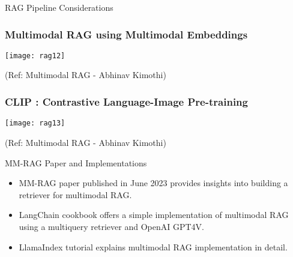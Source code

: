 \begin{frame}[fragile]{RAG Pipeline Considerations}
\begin{itemize}
\begin{itemize}
\begin{frame}[fragile]\frametitle{Multimodal RAG using Multimodal Embeddings}


		\begin{center}
		\texttt{[image: rag12]}
		\end{center}

{\tiny (Ref: Multimodal RAG - Abhinav  Kimothi)}

\end{frame}

\begin{frame}[fragile]\frametitle{CLIP : Contrastive Language-Image Pre-training}


		\begin{center}
		\texttt{[image: rag13]}
		\end{center}

{\tiny (Ref: Multimodal RAG - Abhinav  Kimothi)}

\end{frame}


\begin{frame}[fragile]{MM-RAG Paper and Implementations}
    \begin{itemize}
        \item MM-RAG paper published in June 2023 provides insights into building a retriever for multimodal RAG.
        \item LangChain cookbook offers a simple implementation of multimodal RAG using a multiquery retriever and OpenAI GPT4V.
        \item LlamaIndex tutorial explains multimodal RAG implementation in detail.
    \end{itemize}
\end{frame}


\end{itemize}
\end{itemize}
\end{frame}
